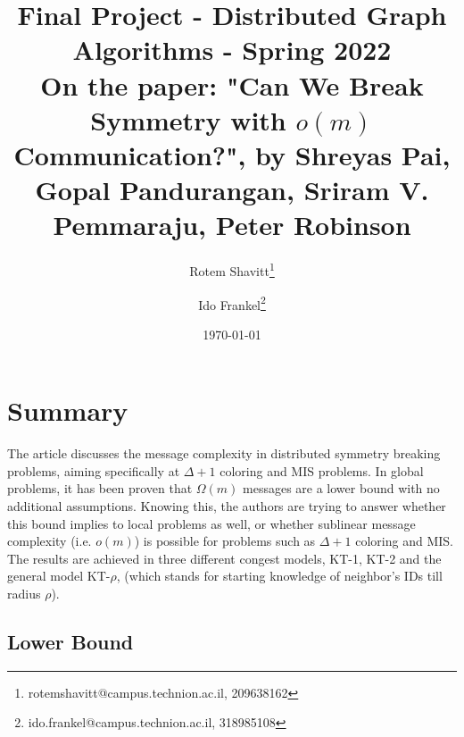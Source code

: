 \documentclass[11pt]{article}
\begin{document}
\title{Final Project - Distributed Graph Algorithms - Spring 2022\\
On the paper: "Can We Break Symmetry with $o(m)$ Communication?", by Shreyas Pai, Gopal Pandurangan, Sriram V. Pemmaraju, Peter Robinson
}
\author{Rotem Shavitt\footnote{rotemshavitt@campus.technion.ac.il, 209638162} \and Ido Frankel\footnote{ido.frankel@campus.technion.ac.il, 318985108}
}
\date{\today}
\maketitle

\section{Summary}

The article discusses the message complexity in distributed symmetry breaking problems, aiming specifically at $\Delta + 1 $ coloring and MIS problems. In global problems, it has been proven that $\Omega(m)$ messages are a lower bound with no additional assumptions. Knowing this, the authors are trying to answer whether this bound implies to local problems as well, or whether sublinear message complexity (i.e. $o(m)$) is possible for problems such as $\Delta +1$ coloring and MIS. The results are achieved in three different congest models, KT-1, KT-2 and the general model KT-$\rho$, (which stands for starting knowledge of neighbor's IDs till radius $\rho$).

\subsection*{Lower Bound}
\end{document}
